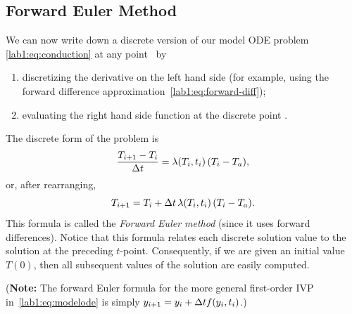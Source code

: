 \subsection{Forward Euler Method}
\label{lab1:sec:forward-euler}

We can now write down a discrete version of our model ODE problem
\eqref{lab1:eq:conduction} at any point \ti\ by
\begin{enumerate}
\item discretizing the derivative on the left hand side (for example,
  using the forward difference approximation~\eqref{lab1:eq:forward-diff});
\item evaluating the right hand side function at the discrete point
  \ti.
\end{enumerate}
The discrete form of the problem is 
\[
  \frac{T_{i+1}-T_i}{\mbox{$\Delta t$}{}} = \lambda(T_i,t_i) \, (T_i-T_a),
\]
or, after rearranging,
\begin{equation}
  T_{i+1} = T_i + \mbox{$\Delta t$}{} \, \lambda(T_i,t_i) \, (T_i-T_a).
  \label{lab1:eq:forward-euler-conduction}
\end{equation}
This formula is called the \emph{Forward Euler method}
(since it uses forward differences).
Notice that this formula relates each discrete solution value to the
solution at the preceding $t$-point.
Consequently, if we are given an initial value $T(0)$, then all
subsequent values of the solution are easily computed.  

({\bf Note:} The forward Euler formula for the more general
first-order IVP in~\eqref{lab1:eq:modelode} is simply 
$y_{i+1} = y_i + \mbox{$\Delta t$}{} f(y_i,t_i)$.)

